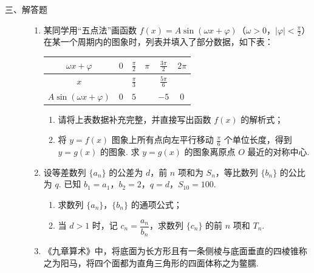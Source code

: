 \begin{description}

    \item[三、解答题]

    \begin{enumerate}[leftmargin=5pt]

      \addtocounter{enumi}{+17}

        \item 某同学用“五点法”画函数 \(f(x)=A\sin(\omega x+\varphi)\)（\(\omega>0\)，\(|\varphi|<\frac{\pi}{2}\)）在某一个周期内的图象时，列表并填入了部分数据，如下表：

\begin{center}
\renewcommand{\arraystretch}{1.25}
\begin{tabular}{|c|c|c|c|c|c|}
\hline
\(\omega x+\varphi\) & \(0\) & \(\frac{\pi}{2}\) & \(\pi\) & \(\frac{3\pi}{2}\) & \(2\pi\) \\
\hline
\(x\) &  & \(\frac{\pi}{3}\) &  & \(\frac{5\pi}{6}\) &  \\
\hline
\(A\sin(\omega x+\varphi)\) & \(0\) & \(5\) &  & \(-5\) & \(0\) \\
\hline
\end{tabular}
\end{center}

\begin{enumerate}
\item 请将上表数据补充完整，并直接写出函数 \(f(x)\) 的解析式；
\item 将 \(y=f(x)\) 图象上所有点向左平行移动 \(\frac{\pi}{6}\) 个单位长度，得到 \(y=g(x)\) 的图象. 求 \(y=g(x)\) 的图象离原点 \(O\) 最近的对称中心.
\end{enumerate}

        \item 设等差数列 \(\{a_n\}\) 的公差为 \(d\)，前 \(n\) 项和为 \(S_n\)，等比数列 \(\{b_n\}\) 的公比为 \(q\). 已知 \(b_1=a_1\)，\(b_2=2\)，\(q=d\)，\(S_{10}=100\).

\begin{enumerate}
\item 求数列 \(\{a_n\}\)，\(\{b_n\}\) 的通项公式；
\item 当 \(d>1\) 时，记 \(c_n=\dfrac{a_n}{b_n}\)，求数列 \(\{c_n\}\) 的前 \(n\) 项和 \(T_n\).
\end{enumerate}

        \item 《九章算术》中，将底面为长方形且有一条侧棱与底面垂直的四棱锥称之为阳马，将四个面都为直角三角形的四面体称之为鳖臑.


\end{enumerate}
\end{description}
